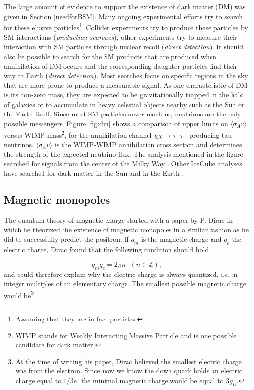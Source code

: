 The large amount of evidence to support the existence of dark matter (DM) was given in Section \ref{needforBSM}. Many ongoing experimental efforts try to search for these elusive particles\footnote{Assuming that they are in fact particles.}. Collider experiments try to produce these particles by SM interactions (\textit{production searches}), other experiments try to measure their interaction with SM particles through nuclear recoil (\textit{direct detection}). It should also be possible to search for the SM products that are produced when annihilation of DM occurs and the corresponding daughter particles find their way to Earth (\textit{direct detection}). Most searches focus on specific regions in the sky that are more prone to produce a measurable signal. As one characteristic of DM is its non-zero mass, they are expected to be gravitationally trapped in the halo of galaxies or to accumulate in heavy celestial objects nearby such as the Sun or the Earth itself. Since most SM particles never reach us, neutrinos are the only possible messengers. Figure \ref{fig:dm} shows a comparison of upper limits on $\langle \sigma_A v\rangle$ versus WIMP mass\footnote{WIMP stands for Weakly Interacting Massive Particle and is one possible candidate for dark matter.}, for the annihilation channel $\chi \chi \rightarrow \tau^+ \tau^-$ producing tau neutrinos. $\langle \sigma_A v\rangle$ is the WIMP-WIMP annihilation cross section and determines the strength of the expected neutrino flux. The analysis mentioned in the figure searched for signals from the center of the Milky Way \cite{Aartsen:2017ulx}. Other IceCube analyses have searched for dark matter in the Sun \cite{Aartsen:2016zhm,Abbasi:2009vg} and in the Earth \cite{Aartsen:2016fep}.

\subsection{Magnetic monopoles}
The quantum theory of magnetic charge started with a paper by P. Dirac \cite{Dirac60} in which he theorized the existence of magnetic monopoles in a similar fashion as he did to successfully predict the positron. If $q_m$ is the magnetic charge and $q_e$ the electric charge, Dirac found that the following condition should hold

\begin{equation}
q_m q_e = 2\pi n \ \ \ (n \in \mathbb{Z}),
\end{equation}
and could therefore explain why the electric charge is always quantized, i.e. in integer multiples of an elementary charge. The smallest possible magnetic charge  would be\footnote{At the time of writing his paper, Dirac believed the smallest electric charge was from the electron. Since now we know the down quark holds an electric charge equal to $1/3 e$, the minimal magnetic charge would be equal to $3g_D$.} 

